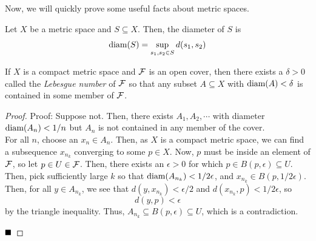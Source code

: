 Now, we will quickly prove some useful facts about metric spaces. 

\begin{definition}
    Let $X$ be a metric space and $S \subseteq X$. Then, the diameter of $S$ is
    \[ \tt{diam}(S) = \sup_{s_1, s_2 \in S}d(s_1, s_2) \]
\end{definition}

\begin{theorem}
    If $X$ is a compact metric space and $\cal{F}$ is an open cover, then there exists a $\delta > 0$ called the \emph{Lebesgue number} of $\cal{F}$ so that any subset $A \subseteq X$ with $\tt{diam}(A) < \delta$ is contained in some member of $\cal{F}$. 
\end{theorem}
\begin{proof}{Proof:}
    Suppose not. Then, there exists $A_1, A_2, \cdots$ with diameter $\tt{diam}(A_n) < 1/n$ but $A_n$ is not contained in any member of the cover.\\

    For all $n$, choose an $x_n \in A_n$. Then, as $X$ is a compact metric space, we can find a subsequence $x_{n_{k}}$ converging to some $p \in X$. Now, $p$ must be inside an element of $\cal{F}$, so let $p \in U \in \cal{F}$. Then, there exists an $\epsilon > 0$ for which $p \in B(p, \epsilon) \subseteq U$. Then, pick sufficiently large $k$ so that $\tt{diam}(A_{n_{k}}) < 1/2 \epsilon$, and $x_{n_k} \in B(p, 1/2 \epsilon)$. Then, for all $y \in A_{n_{k}}$, we see that $d(y, x_{n_k}) < \epsilon/2$ and $d(x_{n_k}, p) < 1/2\epsilon$, so
    \[ d(y, p) < \epsilon \]
    by the triangle inequality. Thus, $A_{n_k} \subseteq B(p, \epsilon) \subseteq U$, which is a contradiction.

    $\qed$
\end{proof}
